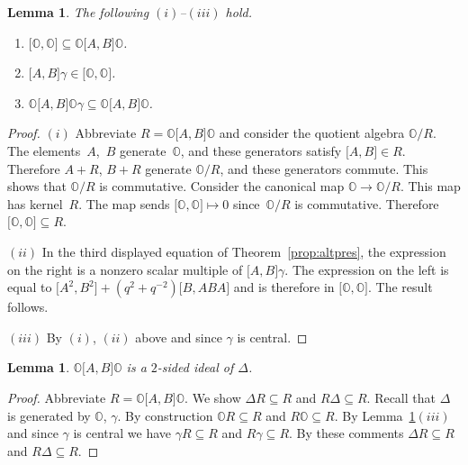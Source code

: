 \documentclass[pdftex]{sigma}
\numberwithin{equation}{section}
\newtheorem{Lemma}[Theorem]{Lemma}
\begin{document}
\begin{Lemma}
\label{lem:three}
The following $(i)$--$(iii)$ hold.
\begin{enumerate}\itemsep=0pt
\item[$(i)$]
$\lbrack \mathbb O,\mathbb O\rbrack \subseteq
\mathbb O \lbrack A,B\rbrack \mathbb O$.
\item[$(ii)$]
$  \lbrack A,B\rbrack
\gamma \in
\lbrack \mathbb O,\mathbb O\rbrack $.
\item[$(iii)$]
$\mathbb O \lbrack A,B\rbrack \mathbb O \gamma \subseteq
\mathbb O \lbrack A,B\rbrack \mathbb O$.
\end{enumerate}
\end{Lemma}
\begin{proof}\sloppy
$(i)$
Abbreviate $R=
\mathbb O \lbrack A,B\rbrack \mathbb O$ and consider the
quotient algebra $\mathbb O/R$.
The ele\-ments~$A$,~$B$ generate~$\mathbb O$, and
these generators satisfy
$\lbrack A,B\rbrack \in R$.
Therefore $A+R$, $B+R$ generate
$\mathbb O/R$, and these generators commute.
This shows that $\mathbb O/R$ is commutative.
Consider the canonical map $\mathbb O \to \mathbb O/R$.
This map has kernel~$R$. The map sends
$\lbrack \mathbb O,\mathbb O\rbrack \mapsto 0 $ since~$\mathbb O/R$ is commutative. Therefore
$\lbrack \mathbb O,\mathbb O\rbrack \subseteq R$.

  $(ii)$ In the third displayed equation of
Theorem~\ref{prop:altpres},
the expression on the right is a nonzero
scalar multiple of
$\lbrack A,B \rbrack \gamma $.
The expression on the left
is equal to
$\lbrack A^2,B^2 \rbrack +(q^2+q^{-2})
\lbrack B,ABA \rbrack $
and is therefore in
$\lbrack \mathbb O,\mathbb O\rbrack $.
The result follows.

  $(iii)$ By $(i)$, $(ii)$ above and
since $\gamma$ is central.
\end{proof}

\begin{Lemma}
\label{lem:ideal}
$\mathbb O \lbrack A,B\rbrack \mathbb O$ is a $2$-sided ideal of
$\Delta $.
\end{Lemma}

\begin{proof}
Abbreviate $R =
\mathbb O \lbrack A,B\rbrack \mathbb O$.
We show $\Delta R\subseteq R$ and
$R\Delta \subseteq R$.
Recall that $\Delta $ is generated by
$\mathbb O$, $\gamma$.
By construction
 $\mathbb O R\subseteq R$ and
$R \mathbb  O\subseteq R$.
By Lemma~\ref{lem:three}$(iii)$ and
since $\gamma$ is central we have
 $\gamma R\subseteq R$ and
$R \gamma \subseteq R$.
By these comments
$\Delta R\subseteq R$ and
$R\Delta \subseteq R$.
\end{proof}
\end{document}
